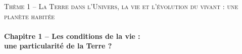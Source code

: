 \documentclass[10.5pt]{article}
\begin{document}



\begin{center}
\textsc{Thème 1 -- La Terre dans l'Univers, la vie et l'évolution du vivant : une planète habitée} \\
~~ \\
\Large{\textbf{Chapitre 1 -- Les conditions de la vie :}} \\
\Large{\textbf{une particularité de la Terre ?}}
\end{center}
\end{document}
